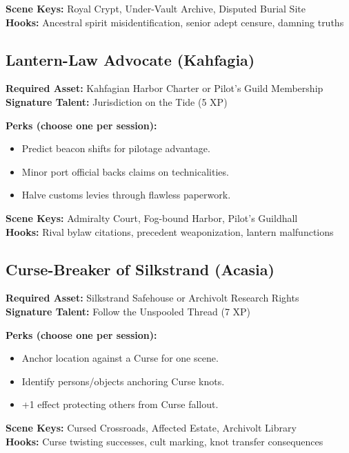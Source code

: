 \textbf{Scene Keys:} Royal Crypt, Under-Vault Archive, Disputed Burial Site\\
\textbf{Hooks:} Ancestral spirit misidentification, senior adept censure, damning truths

\subsection{Lantern-Law Advocate (Kahfagia)}
\label{subsec:lantern-advocate}

\textbf{Required Asset:} Kahfagian Harbor Charter or Pilot's Guild Membership\\
\textbf{Signature Talent:} Jurisdiction on the Tide (5 XP)

\textbf{Perks (choose one per session):}
\begin{itemize}
\item Predict beacon shifts for pilotage advantage.
\item Minor port official backs claims on technicalities.
\item Halve customs levies through flawless paperwork.
\end{itemize}

\textbf{Scene Keys:} Admiralty Court, Fog-bound Harbor, Pilot's Guildhall\\
\textbf{Hooks:} Rival bylaw citations, precedent weaponization, lantern malfunctions

\subsection{Curse-Breaker of Silkstrand (Acasia)}
\label{subsec:curse-breaker}

\textbf{Required Asset:} Silkstrand Safehouse or Archivolt Research Rights\\
\textbf{Signature Talent:} Follow the Unspooled Thread (7 XP)

\textbf{Perks (choose one per session):}
\begin{itemize}
\item Anchor location against a Curse for one scene.
\item Identify persons/objects anchoring Curse knots.
\item +1 effect protecting others from Curse fallout.
\end{itemize}

\textbf{Scene Keys:} Cursed Crossroads, Affected Estate, Archivolt Library\\
\textbf{Hooks:} Curse twisting successes, cult marking, knot transfer consequences

